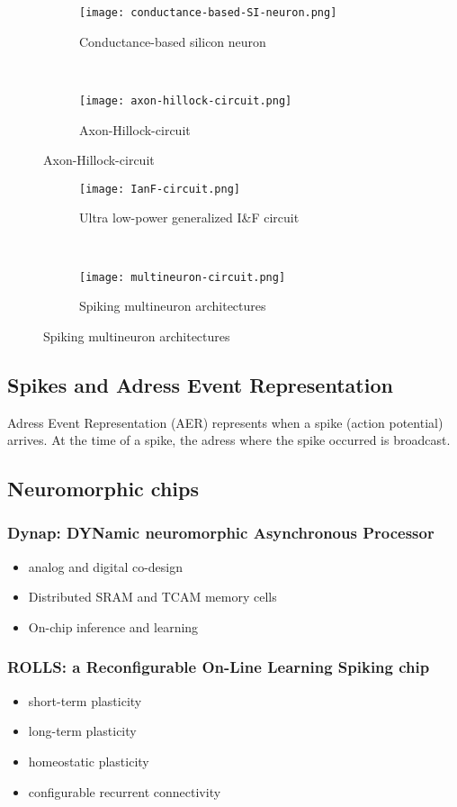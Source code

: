 \documentclass[main]{subfiles}
\begin{document}
\begin{figure}[H]
	\label{fig:circuits}
	\centering
	\begin{subfigure}[b]{0.5\textwidth}
		\centering
		\texttt{[image: conductance-based-SI-neuron.png]}
		\caption{Conductance-based silicon neuron}
	\end{subfigure}%
	~
	\begin{subfigure}[b]{0.5\textwidth}
		\centering
		\texttt{[image: axon-hillock-circuit.png]}
		\caption{Axon-Hillock-circuit}
	\end{subfigure}
\end{figure}
\begin{figure}[H]
	\centering
	\begin{subfigure}[b]{0.5\textwidth}
		\centering
		\texttt{[image: IanF-circuit.png]}
		\caption{Ultra low-power generalized I\&F circuit}
	\end{subfigure}%
	~
	\begin{subfigure}[b]{0.5\textwidth}
		\centering
		\texttt{[image: multineuron-circuit.png]}
		\caption{Spiking multineuron architectures}
	\end{subfigure}
\end{figure}

\subsection{Spikes and Adress Event Representation}

Adress Event Representation (AER) represents when a spike (action potential) arrives. At the time of a spike, the adress where the spike occurred is broadcast.

\subsection{Neuromorphic chips}
\subsubsection{Dynap: DYNamic neuromorphic Asynchronous Processor}
\begin{itemize}
	\item analog and digital co-design
	\item Distributed SRAM and TCAM memory cells
	\item On-chip inference and learning
\end{itemize}
\subsubsection{ROLLS: a Reconfigurable On-Line Learning Spiking chip}
\begin{itemize}
\item short-term plasticity
\item long-term plasticity
\item homeostatic plasticity
\item configurable recurrent connectivity
\end{itemize}
\end{document}
